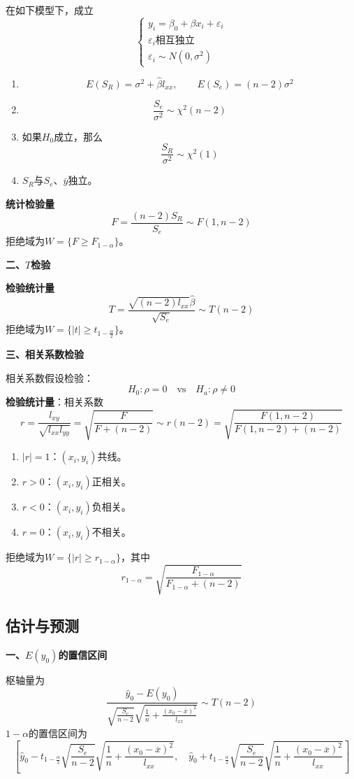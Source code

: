\documentclass[lang = cn, scheme = chinese, thmcnt = section]{elegantbook}
\begin{document}
\begin{theorem}
	在如下模型下，成立
	$$
	\begin{cases}
		y_i=\beta_0+\beta x_i+\varepsilon_i\\
		\varepsilon_i\text{相互独立}\\
		\varepsilon_i\sim N(0,\sigma^2)
	\end{cases}
	$$
	\begin{enumerate}
		\item 
		$$
		E(S_R)=\sigma^2+\hat{\beta}l_{xx},\qquad E(S_e)=(n-2)\sigma^2
		$$
		\item 
		$$
		\frac{S_e}{\sigma^2}\sim \chi^2(n-2)
		$$
		\item 如果$H_0$​成立，那么
		$$
		\frac{S_R}{\sigma^2}\sim \chi^2(1)
		$$
		\item $S_R$与$S_e$、$\overline{y}$独立。
	\end{enumerate}
\end{theorem}

\textbf{统计检验量}
$$
F=\frac{(n-2)S_R}{S_e}\sim F(1,n-2)
$$
拒绝域为$W=\{ F\ge F_{1-\alpha} \}$。

\textbf{二、$T$检验}

\textbf{检验统计量}
$$
T=\frac{\sqrt{(n-2)l_{xx}}\hat{\beta}}{\sqrt{S_e}}\sim T(n-2)
$$
拒绝域为$W=\{ |t|\ge t_{1-\frac{\alpha}{2}}\}$。

\textbf{三、相关系数检验}

相关系数假设检验：
$$
H_0:\rho=0\quad \mathrm{vs} \quad H_a:\rho\ne0
$$
\textbf{检验统计量}：相关系数
$$
r=\frac{l_{xy}}{\sqrt{l_{xx}l_{yy}}}=\sqrt{\frac{F}{F+(n-2)}}\sim r(n-2)= \sqrt{\frac{F(1,n-2)}{F(1,n-2)+(n-2)}}
$$
\begin{enumerate}
	\item $|r|=1$：$(x_i,y_i)$共线。
	\item $r>0$：$(x_i,y_i)$正相关。
	\item $r<0$：$(x_i,y_i)$负相关。
	\item $r=0$：$(x_i,y_i)$不相关。
\end{enumerate}

拒绝域为$W=\{ |r|\ge r_{1-\alpha} \}$，其中
$$
r_{1-\alpha}=\sqrt{\frac{F_{1-\alpha}}{F_{1-\alpha}+(n-2)}}
$$

\subsection{估计与预测}

\textbf{一、$E(y_0)$的置信区间}

枢轴量为
$$
\frac{\hat{y}_0-E(y_0)}{\sqrt{\frac{S_e}{n-2}}\sqrt{\frac{1}{n}+\frac{(x_0-\overline{x})^2}{l_{xx}}}}\sim T(n-2)
$$
$1-\alpha$的置信区间为
$$
\left[
\hat{y}_0-t_{1-\frac{\alpha}{2}}\sqrt{\frac{S_e}{n-2}}\sqrt{\frac{1}{n}+\frac{(x_0-\overline{x})^2}{l_{xx}}},\quad 
\hat{y}_0+t_{1-\frac{\alpha}{2}}\sqrt{\frac{S_e}{n-2}}\sqrt{\frac{1}{n}+\frac{(x_0-\overline{x})^2}{l_{xx}}}
\right]
$$
\end{document}
